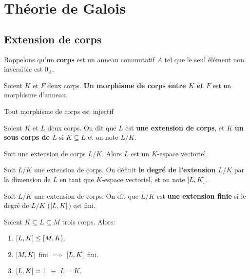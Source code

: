 \chapter{Théorie de Galois}

\section{Extension de corps}

Rappelons qu'un \textbf{corps} est un anneau commutatif $A$ tel que le seul
élément non inversible est $0_{A}$.

\begin{definition} 
	\label{def:morphisme_corps}
	Soient $K$ et $F$ deux corps. \textbf{Un morphisme de corps entre $K$ et $F$}
	est un morphisme d'anneau.
\end{definition}

\begin{proposition}
	Tout morphisme de corps est injectif
\end{proposition}

\begin{definition} 
	\label{def:extension_sous_corps}
	Soient $K$ et $L$ deux corps. On dit que $L$ est \textbf{une extension de
	corps}, et $K$ \textbf{un sous corps de $L$} si $K \subseteq L$ et on note
	$L/K$.
\end{definition}

\begin{proposition}
	Soit une extension de corps $L/K$. Alors $L$ est un $K$-espace vectoriel.
\end{proposition}

\begin{definition} 
	\label{def:degre_extension}
	Soit $L/K$ une extension de corps. On définit \textbf{le degré de
	l'extension $L/K$} par la dimension de $L$ en tant que $K$-espace
	vectoriel, et on note $[L, K]$.
\end{definition}

\begin{definition} 
	Soit $L/K$ une extension de corps. On dit que $L/K$ est \textbf{une
	extension finie} si le degré de $L/K$ ($[L, K]$) est fini.
\end{definition}

\begin{remarque}
	Soient $K \subseteq L \subseteq M$ trois corps.
	Alors:
	\begin{enumerate}
		\item $[L, K] \leq [M, K]$.
		\item $[M, K]$ fini $\implies$ $[L, K]$
			fini.
		\item $[L, K] = 1$ $\equiv$ $L = K$.
	\end{enumerate}
\end{remarque}

